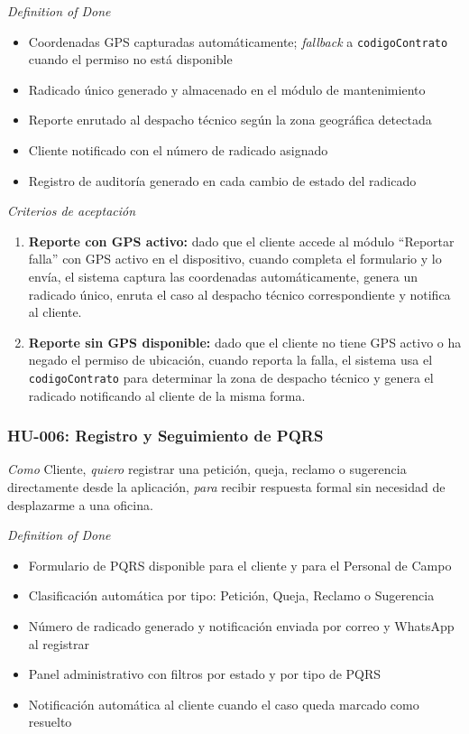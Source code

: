 \documentclass[12pt, a4paper]{article}
\begin{document}
\vspace{6pt}
\noindent\textit{Definition of Done}

\begin{itemize}
  \item Coordenadas GPS capturadas automáticamente; \textit{fallback} a \texttt{codigoContrato} cuando el permiso no está disponible
  \item Radicado único generado y almacenado en el módulo de mantenimiento
  \item Reporte enrutado al despacho técnico según la zona geográfica detectada
  \item Cliente notificado con el número de radicado asignado
  \item Registro de auditoría generado en cada cambio de estado del radicado
\end{itemize}

\vspace{6pt}
\noindent\textit{Criterios de aceptación}

\begin{enumerate}
  \item \textbf{Reporte con GPS activo:} dado que el cliente accede al módulo ``Reportar falla'' con GPS activo en el dispositivo, cuando completa el formulario y lo envía, el sistema captura las coordenadas automáticamente, genera un radicado único, enruta el caso al despacho técnico correspondiente y notifica al cliente.
  \item \textbf{Reporte sin GPS disponible:} dado que el cliente no tiene GPS activo o ha negado el permiso de ubicación, cuando reporta la falla, el sistema usa el \texttt{codigoContrato} para determinar la zona de despacho técnico y genera el radicado notificando al cliente de la misma forma.
\end{enumerate}

\subsubsection{HU-006: Registro y Seguimiento de PQRS}

\noindent\textit{Como} Cliente, \textit{quiero} registrar una petición, queja, reclamo o sugerencia directamente desde la aplicación, \textit{para} recibir respuesta formal sin necesidad de desplazarme a una oficina.

\vspace{6pt}
\noindent\textit{Definition of Done}

\begin{itemize}
  \item Formulario de PQRS disponible para el cliente y para el Personal de Campo
  \item Clasificación automática por tipo: Petición, Queja, Reclamo o Sugerencia
  \item Número de radicado generado y notificación enviada por correo y WhatsApp al registrar
  \item Panel administrativo con filtros por estado y por tipo de PQRS
  \item Notificación automática al cliente cuando el caso queda marcado como resuelto
\end{itemize}
\end{document}
